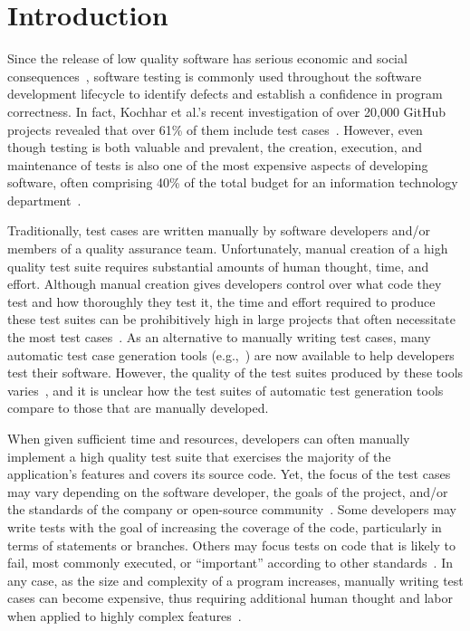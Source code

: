
\section{Introduction}


Since the release of low quality software has serious economic and social consequences~\cite{tassey2002}, software testing is commonly used throughout the software development lifecycle to identify defects and establish a confidence in program correctness. In fact, Kochhar et al.'s recent investigation of over 20,000 GitHub projects revealed that over 61\% of them include test cases~\cite{kochhar2013}.  However, even though testing is both valuable and prevalent, the creation, execution, and maintenance of tests is also one of the most expensive aspects of developing software, often comprising 40\% of the total budget for an information technology department~\cite{vizard2013}.  

Traditionally, test cases are written manually by software developers and/or members of a quality assurance team.
Unfortunately, manual creation of a high quality test suite requires substantial amounts of human thought, time, and
effort.  Although manual creation gives developers control over what code they test and how thoroughly they test it, the
time and effort required to produce these test suites can be prohibitively high in large projects that often necessitate
the most test cases~\cite{kochhar2013}.  As an alternative to manually writing test cases, many automatic test case
generation tools (e.g.,~\cite{fraser:2011:eat:2025113.2025179,pacheco2007feedback,csallner2004}) are now available to
help developers test their software.  However, the quality of the test suites produced by these tools
varies~\cite{bacchelli2008,fraser2013c,fraser2013a}, and it is unclear how the test suites of automatic test generation
tools compare to those that are manually developed.


When given sufficient time and resources, developers can often manually implement a high quality test suite that exercises the majority of the application's features and covers its source code.  Yet, the focus of the test cases may vary depending on the software developer, the goals of the project, and/or the standards of the company or open-source community~\cite{kochhar2013}.  Some developers may write tests with the goal of increasing the coverage of the code, particularly in terms of statements or branches.  Others may focus tests on code that is likely to fail, most commonly executed, or ``important'' according to other standards~\cite{mockus2009}. In any case, as the size and complexity of a program increases, manually writing test cases can become expensive, thus requiring additional human thought and labor when applied to highly complex features~\cite{clarke1998automated}.

